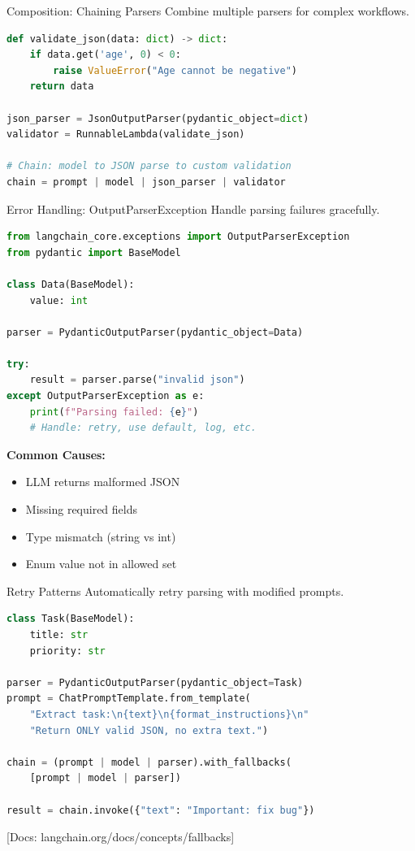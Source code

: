 \documentclass[aspectratio=169,11pt]{beamer}
\newcommand{\docref}[1]{{\scriptsize\color{docgray}[Docs: #1]}}
\begin{document}
\begin{frame}[fragile]{Composition: Chaining Parsers}
Combine multiple parsers for complex workflows.

\begin{lstlisting}[language=Python]
def validate_json(data: dict) -> dict:
    if data.get('age', 0) < 0:
        raise ValueError("Age cannot be negative")
    return data

json_parser = JsonOutputParser(pydantic_object=dict)
validator = RunnableLambda(validate_json)

# Chain: model to JSON parse to custom validation
chain = prompt | model | json_parser | validator
\end{lstlisting}
\end{frame}

\begin{frame}[fragile]{Error Handling: OutputParserException}
Handle parsing failures gracefully.

\begin{lstlisting}[language=Python]
from langchain_core.exceptions import OutputParserException
from pydantic import BaseModel

class Data(BaseModel):
    value: int

parser = PydanticOutputParser(pydantic_object=Data)

try:
    result = parser.parse("invalid json")
except OutputParserException as e:
    print(f"Parsing failed: {e}")
    # Handle: retry, use default, log, etc.
\end{lstlisting}

\vspace{0.1cm}

\textbf{Common Causes:}
\begin{itemize}
  \setlength{\itemsep}{1pt}
  \item LLM returns malformed JSON
  \item Missing required fields
  \item Type mismatch (string vs int)
  \item Enum value not in allowed set
\end{itemize}
\end{frame}

\begin{frame}[fragile]{Retry Patterns}
Automatically retry parsing with modified prompts.

\begin{lstlisting}[language=Python]
class Task(BaseModel):
    title: str
    priority: str

parser = PydanticOutputParser(pydantic_object=Task)
prompt = ChatPromptTemplate.from_template(
    "Extract task:\n{text}\n{format_instructions}\n"
    "Return ONLY valid JSON, no extra text.")

chain = (prompt | model | parser).with_fallbacks(
    [prompt | model | parser])

result = chain.invoke({"text": "Important: fix bug"})
\end{lstlisting}

\docref{langchain.org/docs/concepts/fallbacks}
\end{frame}
\end{document}

